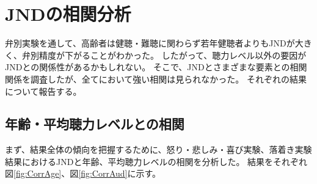 \chapter{JNDの相関分析}
\label{sec:CorrJND}
弁別実験を通して、高齢者は健聴・難聴に関わらず若年健聴者よりもJNDが大きく、弁別精度が下がることがわかった。
したがって、聴力レベル以外の要因がJNDとの関係性があるかもしれない。
そこで、JNDとさまざまな要素との相関関係を調査したが、全てにおいて強い相関は見られなかった。
それぞれの結果について報告する。



\section{年齢・平均聴力レベルとの相関}
まず、結果全体の傾向を把握するために、怒り・悲しみ・喜び実験、落着き実験結果におけるJNDと年齢、平均聴力レベルの相関を分析した。
結果をそれぞれ図\ref{fig:CorrAge}、図\ref{fig:CorrAud}に示す。 

 

